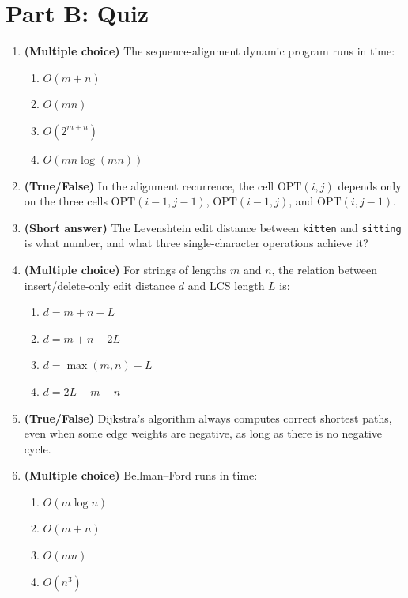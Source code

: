 \documentclass[11pt]{article}
\begin{document}
\newpage
\section*{Part B: Quiz}

\begin{enumerate}[label=\textbf{B\arabic*.}, leftmargin=2.2em]

\item \textbf{(Multiple choice)} The sequence-alignment dynamic program runs in time:
\begin{enumerate}[label=(\alph*)]
    \item $O(m + n)$
    \item $O(m n)$
    \item $O(2^{m+n})$
    \item $O(mn \log(mn))$
\end{enumerate}

\item \textbf{(True/False)} In the alignment recurrence, the cell $\mathrm{OPT}(i,j)$
depends only on the three cells $\mathrm{OPT}(i-1,j-1)$, $\mathrm{OPT}(i-1,j)$, and
$\mathrm{OPT}(i,j-1)$.

\item \textbf{(Short answer)} The Levenshtein edit distance between \texttt{kitten} and
\texttt{sitting} is what number, and what three single-character operations achieve it?

\item \textbf{(Multiple choice)} For strings of lengths $m$ and $n$, the relation between
insert/delete-only edit distance $d$ and LCS length $L$ is:
\begin{enumerate}[label=(\alph*)]
    \item $d = m + n - L$
    \item $d = m + n - 2L$
    \item $d = \max(m,n) - L$
    \item $d = 2L - m - n$
\end{enumerate}

\item \textbf{(True/False)} Dijkstra's algorithm always computes correct shortest paths,
even when some edge weights are negative, as long as there is no negative cycle.

\item \textbf{(Multiple choice)} Bellman--Ford runs in time:
\begin{enumerate}[label=(\alph*)]
    \item $O(m \log n)$
    \item $O(m + n)$
    \item $O(mn)$
    \item $O(n^3)$
\end{enumerate}


\end{enumerate}
\end{document}
